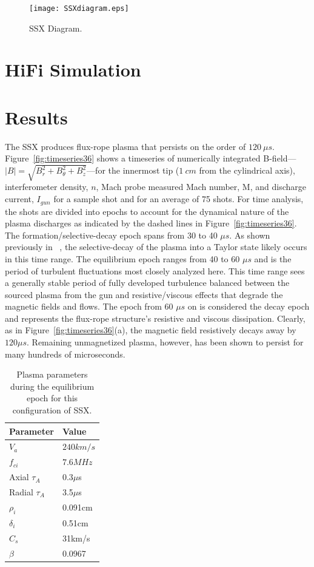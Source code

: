 \documentclass[12pt]{iopart}
\begin{document}
\begin{figure}[!htbp]
\centerline{
\texttt{[image: SSXdiagram.eps]}}
\caption{\label{fig:SSXdiagram} SSX Diagram.}
\end{figure}

\section{HiFi Simulation}

\section{Results}

The SSX produces flux-rope plasma that persists on the order of $120~\mu s$. Figure~\ref{fig:timeseries36} shows a timeseries of numerically integrated B-field---$|B|=\sqrt{B_{r}^{2}+B_{\theta}^{2}+B_{z}^{2}}$---for the innermost tip ($1~cm$ from the cylindrical axis), interferometer density, $n$, Mach probe measured Mach number, M, and discharge current, $I_{gun}$ for a sample shot and for an average of 75 shots. For time analysis, the shots are divided into epochs to account for the dynamical nature of the plasma discharges as indicated by the dashed lines in Figure~\ref{fig:timeseries36}. The formation/selective-decay epoch spans from 30 to 40 $\mu s$. As shown previously in ~\cite{Gray13}, the selective-decay of the plasma into a Taylor state likely occurs in this time range. The equilibrium epoch ranges from 40 to 60 $\mu s$ and is the period of turbulent fluctuations most closely analyzed here. This time range sees a generally stable period of fully developed turbulence balanced between the sourced plasma from the gun and resistive/viscous effects that degrade the magnetic fields and flows. The epoch from 60 $\mu s$ on is considered the decay epoch and represents the flux-rope structure's resistive and viscous dissipation. Clearly, as in Figure~\ref{fig:timeseries36}(a), the magnetic field resistively decays away by $120 \mu s$. Remaining unmagnetized plasma, however, has been shown to persist for many hundreds of microseconds.

\begin{table}
\caption{\label{tab:params}Plasma parameters during the equilibrium epoch for this configuration of SSX.}
\begin{tabular}{ll}
Parameter&Value\\
\hline
$V_{a}$&$240km/s$\\
$f_{ci}$&$7.6MHz$\\
Axial $\tau_{A}$&0.3$\mu$s\\
Radial $\tau_{A}$&3.5$\mu$s\\
$\rho_{i}$&0.091cm\\
$\delta_{i}$&0.51cm\\
$C_{s}$&31km/s\\
$\beta$&0.0967\\
\end{tabular}
\end{table}
\end{document}
